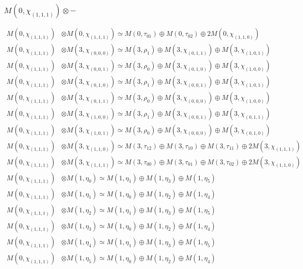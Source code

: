 \subsubsection{$ M(0,\chi_{(1,1,1)})\otimes -$}
\begin{align*}
M(0,\chi_{(1,1,1)}) &\otimes M(0,\chi_{(1,1,1)}) \simeq M(0,\tau_{01}) \oplus M(0,\tau_{02}) \oplus 2 M(0,\chi_{(1,1,0)}) \\
M(0,\chi_{(1,1,1)}) &\otimes M(3,\chi_{(0,0,0)}) \simeq M(3,\rho_{1}) \oplus M(3,\chi_{(0,1,1)}) \oplus M(3,\chi_{(1,0,1)}) \\
M(0,\chi_{(1,1,1)}) &\otimes M(3,\chi_{(0,0,1)}) \simeq M(3,\rho_{0}) \oplus M(3,\chi_{(0,1,0)}) \oplus M(3,\chi_{(1,0,0)}) \\
M(0,\chi_{(1,1,1)}) &\otimes M(3,\chi_{(0,1,0)}) \simeq M(3,\rho_{1}) \oplus M(3,\chi_{(0,0,1)}) \oplus M(3,\chi_{(1,0,1)}) \\
M(0,\chi_{(1,1,1)}) &\otimes M(3,\chi_{(0,1,1)}) \simeq M(3,\rho_{0}) \oplus M(3,\chi_{(0,0,0)}) \oplus M(3,\chi_{(1,0,0)}) \\
M(0,\chi_{(1,1,1)}) &\otimes M(3,\chi_{(1,0,0)}) \simeq M(3,\rho_{1}) \oplus M(3,\chi_{(0,0,1)}) \oplus M(3,\chi_{(0,1,1)}) \\
M(0,\chi_{(1,1,1)}) &\otimes M(3,\chi_{(1,0,1)}) \simeq M(3,\rho_{0}) \oplus M(3,\chi_{(0,0,0)}) \oplus M(3,\chi_{(0,1,0)}) \\
M(0,\chi_{(1,1,1)}) &\otimes M(3,\chi_{(1,1,0)}) \simeq M(3,\tau_{12}) \oplus M(3,\tau_{10}) \oplus M(3,\tau_{11}) \oplus 2 M(3,\chi_{(1,1,1)}) \\
M(0,\chi_{(1,1,1)}) &\otimes M(3,\chi_{(1,1,1)}) \simeq M(3,\tau_{00}) \oplus M(3,\tau_{01}) \oplus M(3,\tau_{02}) \oplus 2 M(3,\chi_{(1,1,0)}) \\
M(0,\chi_{(1,1,1)}) &\otimes M(1,\eta_{0}) \simeq M(1,\eta_{1}) \oplus M(1,\eta_{3}) \oplus M(1,\eta_{5}) \\
M(0,\chi_{(1,1,1)}) &\otimes M(1,\eta_{1}) \simeq M(1,\eta_{0}) \oplus M(1,\eta_{2}) \oplus M(1,\eta_{4}) \\
M(0,\chi_{(1,1,1)}) &\otimes M(1,\eta_{2}) \simeq M(1,\eta_{1}) \oplus M(1,\eta_{3}) \oplus M(1,\eta_{5}) \\
M(0,\chi_{(1,1,1)}) &\otimes M(1,\eta_{3}) \simeq M(1,\eta_{0}) \oplus M(1,\eta_{2}) \oplus M(1,\eta_{4}) \\
M(0,\chi_{(1,1,1)}) &\otimes M(1,\eta_{4}) \simeq M(1,\eta_{1}) \oplus M(1,\eta_{3}) \oplus M(1,\eta_{5}) \\
M(0,\chi_{(1,1,1)}) &\otimes M(1,\eta_{5}) \simeq M(1,\eta_{0}) \oplus M(1,\eta_{2}) \oplus M(1,\eta_{4}) \\

\end{align*}
